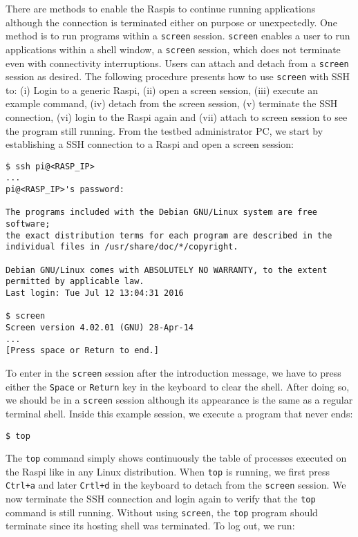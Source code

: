 There are methods to enable the \ac{Raspi}s to continue running
applications although the connection is terminated either on purpose or
unexpectedly. One method is to run programs within a \texttt{screen} session.
\texttt{screen} enables a user to run applications within a shell
window, a \texttt{screen} session, which does not terminate even with
connectivity interruptions. Users can attach and detach from a
\texttt{screen} session
as desired. The following procedure presents how to use \texttt{screen} with
\ac{SSH} to: (i) Login to a generic \ac{Raspi}, (ii) open a screen session,
(iii) execute an example command, (iv) detach from the screen session, (v)
terminate the \ac{SSH} connection, (vi) login to the \ac{Raspi} again
and (vii) attach to screen session to see the program still running.
From the testbed administrator \ac{PC}, we start by establishing a \ac{SSH}
connection to a \ac{Raspi} and open a screen session:

\begin{lstlisting}[]
$ ssh pi@<RASP_IP>
...
pi@<RASP_IP>'s password:

The programs included with the Debian GNU/Linux system are free software;
the exact distribution terms for each program are described in the
individual files in /usr/share/doc/*/copyright.

Debian GNU/Linux comes with ABSOLUTELY NO WARRANTY, to the extent
permitted by applicable law.
Last login: Tue Jul 12 13:04:31 2016

$ screen
Screen version 4.02.01 (GNU) 28-Apr-14
...
[Press space or Return to end.]
\end{lstlisting}
\FloatBarrier
\vspace{-5mm}

To enter in the \texttt{screen} session after the introduction message, we
have to press either the \texttt{Space} or \texttt{Return} key in the
keyboard to clear the shell. After doing so, we should be in a
\texttt{screen} session although its appearance is the same as a regular
terminal shell. Inside this example session, we execute a program that
never ends:

\begin{lstlisting}[]
$ top
\end{lstlisting}
\FloatBarrier
\vspace{-5mm}

The \texttt{top} command simply shows continuously the table of processes
executed on the \ac{Raspi} like in any Linux distribution. When \texttt{top}
is running, we first press \texttt{Ctrl+a} and later \texttt{Crtl+d}
in the keyboard to detach from the \texttt{screen} session. We now
terminate the \ac{SSH} connection and login again to verify that the
\texttt{top} command is still running. Without using \texttt{screen},
the \texttt{top} program should terminate since its hosting shell was
terminated. To log out, we run:

